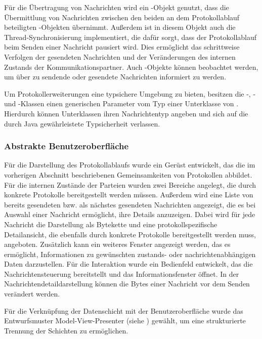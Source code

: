 Für die Übertragung von Nachrichten wird ein -Objekt genutzt, dass die Übermittlung von Nachrichten zwischen den beiden an dem Protokollablauf beteiligten -Objekten übernimmt. Außerdem ist in diesem Objekt auch die Thread-Synchronisierung implementiert, die dafür sorgt, dass der Protokollablauf beim Senden einer Nachricht pausiert wird. Dies ermöglicht das schrittweise Verfolgen der gesendeten Nachrichten und der Veränderungen des internen Zustands der Kommunikationspartner. Auch -Objekte können beobachtet werden, um über zu sendende oder gesendete Nachrichten informiert zu werden.

Um Protokollerweiterungen eine typsichere Umgebung zu bieten, besitzen die \nobreakdash-, - und -Klassen einen generischen Parameter vom Typ einer Unterklasse von . Hierdurch können Unterklassen ihren Nachrichtentyp angeben und sich auf die durch Java gewährleistete Typsicherheit verlassen.

\subsubsection{Abstrakte Benutzeroberfläche}
Für die Darstellung des Protokollablaufs wurde ein Gerüst entwickelt, das die im vorherigen Abschnitt beschriebenen Gemeinsamkeiten von Protokollen abbildet. Für die internen Zustände der Parteien wurden zwei Bereiche angelegt, die durch konkrete Protokolle bereitgestellt werden müssen. Außerdem wird eine Liste von bereits gesendeten bzw. als nächstes gesendeten Nachrichten angezeigt, die es  bei Auswahl einer Nachricht ermöglicht, ihre Details anzuzeigen. Dabei wird für jede Nachricht die Darstellung als Bytekette und eine protokollspezifische Detailansicht, die ebenfalls durch konkrete Protokolle bereitgestellt werden muss, angeboten. Zusätzlich kann ein weiteres Fenster angezeigt werden, das es ermöglicht, Informationen zu gewünschten zustands- oder nachrichtenabhängigen Daten darzustellen. Für die Interaktion wurde ein Bedienfeld entwickelt, das die Nachrichtensteuerung bereitstellt und das Informationsfenster öffnet. In der Nachrichtendetaildarstellung können die Bytes einer Nachricht vor dem Senden verändert werden.

Für die Verknüpfung der Datenschicht mit der Benutzeroberfläche wurde das Entwurfsmuster Model-View-Presenter (siehe \cite{potel96}) gewählt, um eine strukturierte Trennung der Schichten zu ermöglichen.

